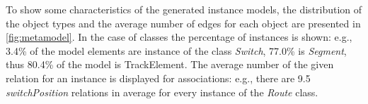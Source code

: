 To show some characteristics of the generated instance models, the distribution of the object types and the average number of edges for each object are presented in \autoref{fig:metamodel}. In the case of classes the percentage of instances is shown: e.g., 3.4\% of the model elements are instance of the class \emph{Switch}, 77.0\% is \emph{Segment}, thus 80.4\% of the model is TrackElement. The average number of the given relation for an instance is displayed for associations: e.g., there are 9.5 \emph{switchPosition} relations in average for every instance of the \emph{Route} class.